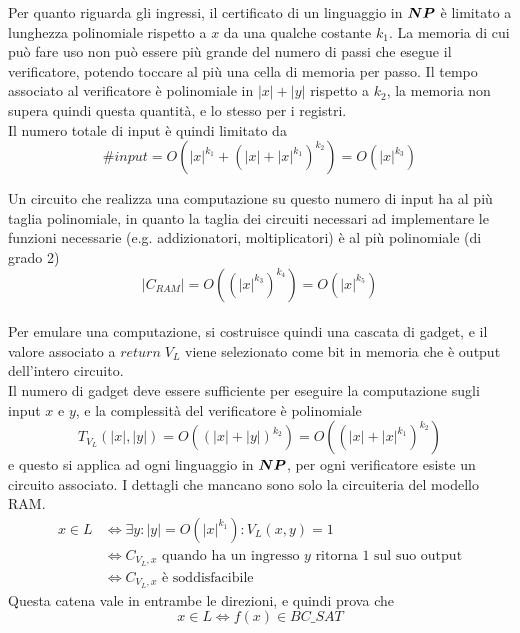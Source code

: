 Per quanto riguarda gli ingressi, il certificato di un linguaggio in $\bm{NP}$ è limitato a lunghezza polinomiale rispetto a $x$ da una qualche costante $k_1$. La memoria di cui può fare uso non può essere più grande del numero di passi che esegue il verificatore, potendo toccare al più una cella di memoria per passo.
Il tempo associato al verificatore è polinomiale in $|x|+|y|$ rispetto a $k_2$, la memoria non supera quindi questa quantità, e lo stesso per i registri.
\\
Il numero totale di input è quindi limitato da
\begin{equation*}
    \# input =
    O \left( |x|^{k_1} + \left( |x|+|x|^{k_1} \right)^{k_2} \right)
    =
    O \left( |x|^{k_3} \right)
\end{equation*}

Un circuito che realizza una computazione su questo numero di input ha al più taglia polinomiale, in quanto la taglia dei circuiti necessari ad implementare le funzioni necessarie (e.g. addizionatori, moltiplicatori) è al più polinomiale (di grado 2)
\begin{equation*}
    |C_{RAM}| =
    O
    \left( 
        \left( |x|^{k_3} \right)^{k_4}
    \right)
    =
    O \left( |x|^{k_5} \right)
\end{equation*}
\\
Per emulare una computazione, si costruisce quindi una cascata di gadget, e il valore associato a $return \; V_L$ viene selezionato come bit in memoria che è output dell'intero circuito.
\\
Il numero di gadget deve essere sufficiente per eseguire la computazione sugli input $x$ e $y$, e la complessità del verificatore è polinomiale
\begin{equation*}
    T_{V_{L}} (|x|, |y|) = O \left( \left( |x|+|y| \right)^{k_{2}} \right) = 
    O \left( \left( |x|+|x|^{k_1} \right)^{k_2} \right)
\end{equation*}
e questo si applica ad ogni linguaggio in $\bm{NP}$, per ogni verificatore esiste un circuito associato. I dettagli che mancano sono solo la circuiteria del modello RAM.
\begin{align*}
    x \in L
    &\Leftrightarrow
    \exists y : |y| = O \left( |x|^{k_1} \right) : V_L (x,y) = 1 
    \\
    &\Leftrightarrow 
    C_{V_L, x} \text{ quando ha un ingresso $y$ ritorna $1$ sul suo output}
    \\
    &\Leftrightarrow 
    C_{V_L, x} \text{ è soddisfacibile}
\end{align*}
Questa catena vale in entrambe le direzioni, e quindi prova che
\begin{equation*}
    x \in L \Leftrightarrow f(x) \in BC\_SAT
\end{equation*}

